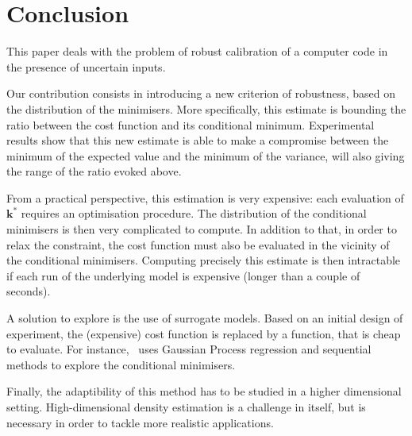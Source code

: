 \documentclass[preprint, 1p]{elsarticle}
\begin{document}
\clearpage
\section*{Conclusion}  %
This paper deals with the problem of robust calibration of a computer code in the presence of uncertain inputs. 

Our contribution consists in introducing a new criterion of robustness, based on the distribution of the minimisers. More specifically, this estimate is bounding the ratio between the cost function and its conditional minimum.
Experimental results show that this new estimate is able to make a compromise between the minimum of the expected value and the minimum of the variance, will also giving the range of the ratio evoked above.

From a practical perspective, this estimation is very expensive: each evaluation of $\mathbf{k}^*$ requires an optimisation procedure. The distribution of the conditional minimisers is then very complicated to compute.
In addition to that, in order to relax the constraint, the cost function must also be evaluated in the vicinity of the conditional minimisers. Computing precisely this estimate is then intractable if each run of the underlying model is expensive (longer than a couple of seconds).


A solution to explore is the use of surrogate models. Based on an initial design of experiment, the (expensive) cost function is replaced by a function, that is cheap to evaluate.
For instance,~\cite{ginsbourger_bayesian_2014}
uses Gaussian Process regression and sequential methods to explore the conditional minimisers.

Finally, the adaptibility of this method has to be studied in a higher dimensional setting. High-dimensional density estimation is a challenge in itself, but is necessary in order to tackle more realistic applications.








 

\end{document}
